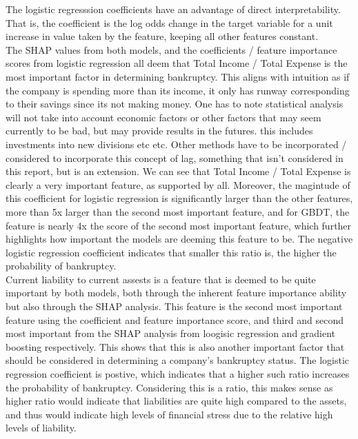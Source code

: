 \documentclass[11pt]{article}
\begin{document}
The logistic regresssion coefficients have an advantage of direct interpretability. That is, the coefficient is the log odds change in the target variable for a unit increase in value taken by the feature, keeping all other features constant. \\

The SHAP values from both models, and the coefficients / feature importance scores from logistic regression all deem that Total Income / Total Expense is the most important factor in determining bankruptcy. This aligns with intuition as if the company is spending more than its income, it only has runway corresponding to their savings since its not making money. One has to note statistical analysis will not take into account economic factors or other factors that may seem currently to be bad, but may provide results in the futures. this includes investments into new divisions etc etc. Other methods have to be incorporated / considered to incorporate this concept of lag, something that isn't considered in this report, but is an extension. We can see that Total Income / Total Expense is clearly a very important feature, as supported by all. Moreover, the magintude of this coefficient for logistic regression is significantly larger than the other features, more than 5x larger than the second most important feature, and for GBDT, the feature is nearly 4x the score of the second most important feature, which further highlights how important the models are deeming this feature to be. The negative logistic regression coefficient indicates that smaller this ratio is, the higher the probability of bankruptcy.  \\

Current liability to current assests is a feature that is deemed to be quite important by both models, both through the inherent feature importance ability but also through the SHAP analysis. This feature is the second most important feature using the coefficient and feature importance score, and third and second most important from the SHAP analysis from loogisic regression and gradient boosting respectively. This shows that this is also another important factor that should be considered in determining a company's bankruptcy status. The logistic regression coefficient is postive, which indicates that a higher such ratio increases the probability of bankruptcy. Considering this is a ratio, this makes sense as  higher ratio would indicate that liabilities are quite high compared to the assets, and thus would indicate high levels of financial stress due to the relative high levels of liability. \\ 
\end{document}
